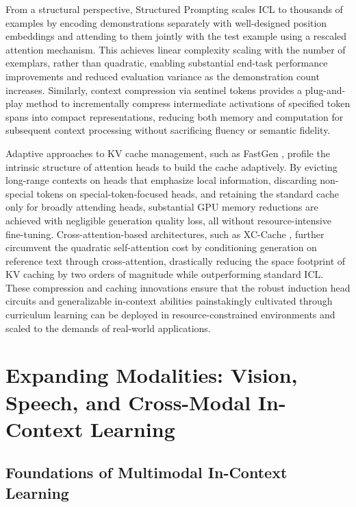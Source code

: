 \documentclass[11pt]{article}
\begin{document}
From a structural perspective, Structured Prompting \cite{ref208} scales ICL to thousands of examples by encoding demonstrations separately with well-designed position embeddings and attending to them jointly with the test example using a rescaled attention mechanism. This achieves linear complexity scaling with the number of exemplars, rather than quadratic, enabling substantial end-task performance improvements and reduced evaluation variance as the demonstration count increases. Similarly, context compression via sentinel tokens \cite{ref209} provides a plug-and-play method to incrementally compress intermediate activations of specified token spans into compact representations, reducing both memory and computation for subsequent context processing without sacrificing fluency or semantic fidelity.

Adaptive approaches to KV cache management, such as FastGen \cite{ref210}, profile the intrinsic structure of attention heads to build the cache adaptively. By evicting long-range contexts on heads that emphasize local information, discarding non-special tokens on special-token-focused heads, and retaining the standard cache only for broadly attending heads, substantial GPU memory reductions are achieved with negligible generation quality loss, all without resource-intensive fine-tuning. Cross-attention-based architectures, such as XC-Cache \cite{ref211}, further circumvent the quadratic self-attention cost by conditioning generation on reference text through cross-attention, drastically reducing the space footprint of KV caching by two orders of magnitude while outperforming standard ICL. These compression and caching innovations ensure that the robust induction head circuits and generalizable in-context abilities painstakingly cultivated through curriculum learning can be deployed in resource-constrained environments and scaled to the demands of real-world applications.

\section{Expanding Modalities: Vision, Speech, and Cross-Modal In-Context Learning}

\subsection{Foundations of Multimodal In-Context Learning}
\end{document}

